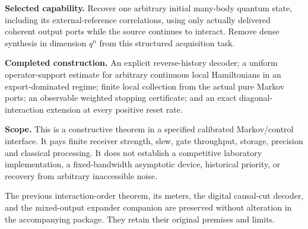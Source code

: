 \documentclass[11pt,a4paper]{article}
\begin{document}
\hypersetup{pageanchor=false}
\begin{titlepage}
\vspace{10mm}{\huge\bfseries Scalable output-only acquisition\newline from interacting many-body sources\par}
\vspace{6mm}{\Large Observed local noise, finite chronological collection,\newline and a quantum decoder with local controls\par}
\vspace{10mm}{\large 5 November 2026, Australia/Brisbane\par}\vspace{12mm}
\textbf{Selected capability.} Recover one arbitrary initial many-body quantum state, including its external-reference correlations, using only actually delivered coherent output ports while the source continues to interact. Remove dense synthesis in dimension $q^n$ from this structured acquisition task.

\textbf{Completed construction.} An explicit reverse-history decoder; a uniform operator-support estimate for arbitrary continuous local Hamiltonians in an export-dominated regime; finite local collection from the actual pure Markov ports; an observable weighted stopping certificate; and an exact diagonal-interaction extension at every positive reset rate.

\textbf{Scope.} This is a constructive theorem in a specified calibrated Markov/control interface. It pays finite receiver strength, slew, gate throughput, storage, precision and classical processing. It does not establish a competitive laboratory implementation, a fixed-bandwidth asymptotic device, historical priority, or recovery from arbitrary inaccessible noise.

\vfill The previous interaction-order theorem, its meters, the digital causal-cut decoder, and the mixed-output expander companion are preserved without alteration in the accompanying package. They retain their original premises and limits.
\end{titlepage}
\hypersetup{pageanchor=true}
\end{document}
